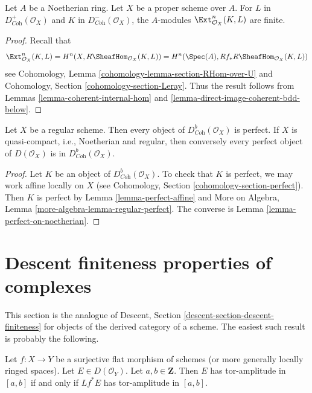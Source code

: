\begin{lemma}
\label{lemma-ext-finite}
Let $A$ be a Noetherian ring. Let $X$ be a proper scheme over $A$.
For $L$ in
$D^+_{\textit{Coh}}(\mathcal{O}_X)$ and $K$ in
$D^-_{\textit{Coh}}(\mathcal{O}_X)$, the $A$-modules
$\Ext_{\mathcal{O}_X}^n(K, L)$ are finite.
\end{lemma}

\begin{proof}
Recall that
$$
\Ext_{\mathcal{O}_X}^n(K, L) =
H^n(X, R\SheafHom_{\mathcal{O}_X}(K, L)) =
H^n(\Spec(A), Rf_*R\SheafHom_{\mathcal{O}_X}(K, L))
$$
see Cohomology, Lemma \ref{cohomology-lemma-section-RHom-over-U}
and Cohomology, Section \ref{cohomology-section-Leray}.
Thus the result follows from
Lemmas \ref{lemma-coherent-internal-hom} and
\ref{lemma-direct-image-coherent-bdd-below}.
\end{proof}

\begin{lemma}
\label{lemma-perfect-on-regular}
Let $X$ be a regular scheme. Then
every object of $D^b_{\textit{Coh}}(\mathcal{O}_X)$ is perfect.
If $X$ is quasi-compact, i.e., Noetherian and regular,
then conversely every perfect object of
$D(\mathcal{O}_X)$ is in $D^b_{\textit{Coh}}(\mathcal{O}_X)$.
\end{lemma}

\begin{proof}
Let $K$ be an object of $D^b_{\textit{Coh}}(\mathcal{O}_X)$.
To check that $K$ is perfect, we may work affine locally on $X$
(see Cohomology, Section \ref{cohomology-section-perfect}).
Then $K$ is perfect by Lemma \ref{lemma-perfect-affine} and
More on Algebra, Lemma \ref{more-algebra-lemma-regular-perfect}.
The converse is Lemma \ref{lemma-perfect-on-noetherian}.
\end{proof}




\section{Descent finiteness properties of complexes}
\label{section-descent-finiteness}

\noindent
This section is the analogue of
Descent, Section \ref{descent-section-descent-finiteness}
for objects of the derived category of a scheme.
The easiest such result is probably the following.

\begin{lemma}
\label{lemma-tor-amplitude-descends}
Let $f : X \to Y$ be a surjective flat morphism of schemes
(or more generally locally ringed spaces).
Let $E \in D(\mathcal{O}_Y)$. Let $a, b \in \mathbf{Z}$.
Then $E$ has tor-amplitude in $[a, b]$ if and only if
$Lf^*E$ has tor-amplitude in $[a, b]$.
\end{lemma}

